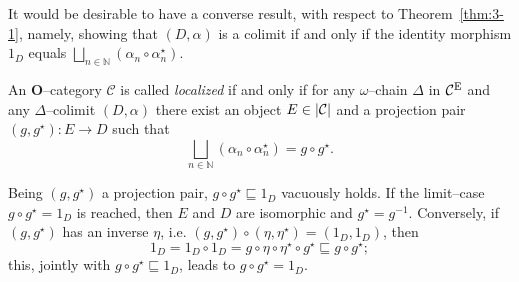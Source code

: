 It would be desirable to have a converse result, with respect to Theorem~\ref{thm:3-1}, namely, showing that \((D,\alpha)\) is a colimit if and only if the identity morphism \(1_D\) equals \(\bigsqcup_{n \in \mathbb{N}}(\alpha_n \circ \alpha_n^\star)\).

\begin{dfn}\label{dfn:localized}
  An \(\mathbf{O}\)--category \(\mathcal{C}\) is called \emph{localized} if and only if for any \(\omega\)--chain \(\Delta\) in \(\mathcal{C}^\textup{E}\) and any \(\Delta\)--colimit \((D,\alpha)\) there exist an object \(E \in \lvert \mathcal{C} \rvert\) and a projection pair \((g,g^\star) \colon E \to D\) such that %
  \begin{equation*}
    \bigsqcup_{n \in \mathbb{N}}(\alpha_n \circ \alpha_n^\star) = g \circ g^\star.
  \end{equation*}
\end{dfn}

Being \((g,g^\star)\) a projection pair, \(g \circ g^\star \sqsubseteq 1_D\) vacuously holds. If the limit--case \(g \circ g^\star = 1_D\) is reached, then \(E\) and \(D\) are isomorphic and \(g^\star = g^{-1}\). %
Conversely, if \((g,g^\star)\) has an inverse \(\eta\), i.e. \((g,g^\star) \circ (\eta,\eta^\star) = (1_D,1_D)\), then %
\begin{equation*}
    1_D = 1_D \circ 1_D = g \circ \eta \circ \eta^\star \circ g^\star
    \sqsubseteq g \circ g^\star;
\end{equation*}
this, jointly with \(g \circ g^\star \sqsubseteq 1_D\), leads to \(g \circ g^\star = 1_D\).

